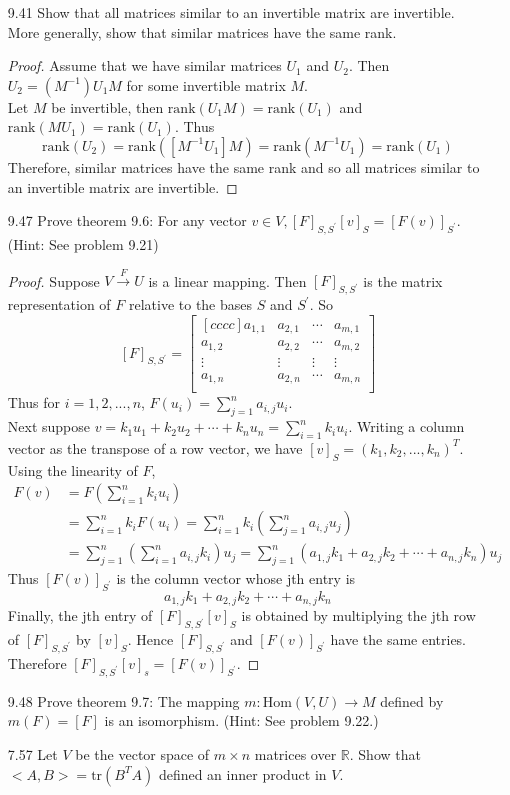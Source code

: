 \documentclass[12pt]{article}
\theoremstyle{definition}
\theoremstyle{plain}
\begin{document}
\begin{enumerate}
\item[9.41]Show that all matrices similar to an invertible matrix are invertible. More generally, show that similar matrices have the same rank.\\
	\begin{proof}
	Assume that we have similar matrices $U_1$ and $U_2$. Then $U_2=(M^{-1})U_1M$ for some invertible matrix $M$.\\
	Let $M$ be invertible, then $\mathrm{rank}(U_1M)=\mathrm{rank}(U_1)$ and $\mathrm{rank}(MU_1)=\mathrm{rank}(U_1)$. Thus
	\[ \mathrm{rank}(U_2)=\mathrm{rank}([M^{-1}U_1]M)=\mathrm{rank}(M^{-1}U_1)=\mathrm{rank}(U_1) \]
	Therefore, similar matrices have the same rank and so all matrices similar to an invertible matrix are invertible.
	\end{proof}
\item[9.47]Prove theorem 9.6: For any vector $v\in V,[F]_{S,S^\prime}[v]_S=[F(v)]_{S^\prime}$. (Hint: See problem 9.21)\\
	\begin{proof}
	Suppose $V \xrightarrow[]{F} U$ is a linear mapping. Then $[F]_{S,S^\prime}$ is the matrix representation of $F$ relative to the bases $S$ and $S^\prime$. So
	\[ [F]_{S,S^\prime} = \begin{bmatrix}[cccc]a_{1,1}&a_{2,1}&\cdots &a_{m,1}\\a_{1,2}&a_{2,2}&\cdots &a_{m,2}\\\vdots & \vdots & \vdots & \vdots\\a_{1,n}&a_{2,n}&\cdots &a_{m,n}\\\end{bmatrix} \]
	Thus for $i=1,2,...,n$, $F(u_i)=\sum_{j=1}^n a_{i,j}u_i$.\\
	Next suppose $v=k_1u_1+k_2u_2+\cdots +k_nu_n=\sum_{i=1}^n k_iu_i$. Writing a column vector as the transpose of a row vector, we have $[v]_S=(k_1,k_2,...,k_n)^T$.\\
	Using the linearity of $F$,
	\begin{align*}
	F(v)&=F\left (\sum_{i=1}^nk_iu_i\right )\\
	&=\sum_{i=1}^nk_iF(u_i)=\sum_{i=1}^nk_i\left (\sum_{j=1}^na_{i,j}u_j\right )\\
	&= \sum_{j=1}^n\left (\sum_{i=1}^na_{i,j}k_i\right )u_j = \sum_{j=1}^n(a_{1,j}k_1+a_{2,j}k_2+\cdots + a_{n,j}k_n)u_j
	\end{align*}
	Thus $[F(v)]_{S^\prime}$ is the column vector whose jth entry is
	\[ a_{1,j}k_1+a_{2,j}k_2+\cdots +a_{n,j}k_n \]
	Finally, the jth entry of $[F]_{S,S^\prime}[v]_S$ is obtained by multiplying the jth row of $[F]_{S,S^\prime}$ by $[v]_S$. Hence $[F]_{S,S^\prime}$ and $[F(v)]_{S^\prime}$ have the same entries. Therefore $[F]_{S,S^\prime}[v]_s=[F(v)]_{S^\prime}$.
	\end{proof}
\item[9.48] Prove theorem 9.7: The mapping $m:\mathrm{Hom}(V,U)\rightarrow M$ defined by $m(F)=[F]$ is an isomorphism. (Hint: See problem 9.22.)
\item[7.57]Let $V$ be the vector space of $m\times n$ matrices over $\mathbb{R}$. Show that $<A,B>=\mathrm{tr}(B^TA)$ defined an inner product in $V$.





\end{enumerate}
\end{document}
